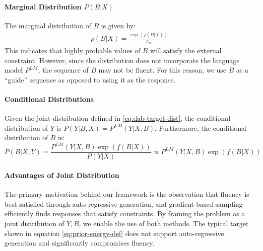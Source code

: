 \paragraph{Marginal Distribution $P(B|X)$}

The marginal distribution of \( B \) is given by:
\begin{align}
    p(B|X) = \frac{\exp(f(B | X))}{Z_B}
\end{align}
This indicates that highly probable values of $B$ will satisfy the external constraint. However, since the distribution does not incorporate the language model $P^{LM}$, the sequence of $B$ may not be fluent. For this reason, we use $B$ as a ``guide'' sequence as opposed to using it as the response. 

\paragraph{Conditional Distributions}
Given the joint distribution defined in \eqref{eq:dab-target-dist}, the conditional distribution of \( Y \) is $P(Y | B, X) = P^{LM}(Y | X, B)$. 
Furthermore, the conditional distribution of $B$ is:
\[
P(B | X, Y) = \frac{P^{LM}(Y | X, B) \exp(f(B | X))}{P(Y|X)} \propto P^{LM}(Y | X, B) \exp(f(B | X))
\]

\paragraph{Advantages of Joint Distribution}

The primary motivation behind our framework is the observation that fluency is best satisfied through auto-regressive generation, and gradient-based sampling efficiently finds responses that satisfy constraints. By framing the problem as a joint distribution of $Y, B$, we enable the use of both methods. The typical target shown in equation \eqref{eq:prior-energy-def} does not support auto-regressive generation and significantly compromises fluency. 
